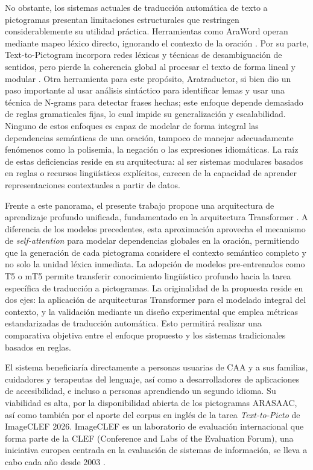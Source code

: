 \documentclass[10pt,letterpaper]{article}
\begin{document}
No obstante, los sistemas actuales de traducción automática de texto a pictogramas presentan limitaciones estructurales que restringen considerablemente su utilidad práctica. Herramientas como AraWord operan mediante mapeo léxico directo, ignorando el contexto de la oración \autocite{araword2020}. Por su parte,  Text-to-Pictogram incorpora redes léxicas y técnicas de desambiguación de sentidos, pero pierde la coherencia global al procesar el texto de forma lineal y modular \autocite{vandeghinste2016}. Otra herramienta para este propósito, Aratraductor, si bien dio un paso importante al usar análisis sintáctico  para identificar lemas y  usar una técnica de N-grams para detectar frases hechas; este enfoque depende demasiado de reglas gramaticales fijas, lo cual impide su generalización y escalabilidad. Ninguno de estos enfoques es capaz de modelar de forma integral las dependencias semánticas de una oración, tampoco de manejar adecuadamente fenómenos como la polisemia, la negación o las expresiones idiomáticas. La raíz de estas deficiencias reside en su arquitectura: al ser sistemas modulares basados en reglas o recursos lingüísticos explícitos, carecen de la capacidad de aprender representaciones contextuales a partir de datos.

Frente a este panorama, el presente trabajo propone una arquitectura de aprendizaje profundo unificada, fundamentado en la arquitectura Transformer \cite{vaswani2017}. A diferencia de los modelos precedentes, esta aproximación aprovecha el mecanismo de \textit{self-attention} para modelar dependencias globales en la oración, permitiendo que la generación de cada pictograma considere el contexto semántico completo y no solo la unidad léxica inmediata. La adopción de modelos pre-entrenados como T5 o mT5 \cite{raffel2020}  permite transferir conocimiento lingüístico profundo hacia la tarea específica de traducción a pictogramas. La originalidad de la propuesta reside en dos ejes: la aplicación de arquitecturas Transformer para el modelado integral del contexto, y la validación mediante un diseño experimental que emplea métricas estandarizadas de traducción automática. Esto permitirá realizar una comparativa objetiva entre el enfoque propuesto y los sistemas tradicionales basados en reglas.

El sistema beneficiaría directamente a personas usuarias de CAA y a sus familias, cuidadores y terapeutas del lenguaje, así como a desarrolladores de aplicaciones de accesibilidad, e incluso a personas aprendiendo un segundo idioma. Su viabilidad es alta,  por la disponibilidad abierta de los pictogramas ARASAAC, así como también por el aporte del corpus en inglés de la tarea \textit{Text-to-Picto} de ImageCLEF 2026. ImageCLEF es un laboratorio de evaluación internacional que forma parte de la CLEF (Conference and Labs of the Evaluation Forum), una iniciativa europea centrada en la evaluación de sistemas de información, se lleva a cabo cada año desde 2003 \autocite{unknown-author-no-date2}.
\end{document}

